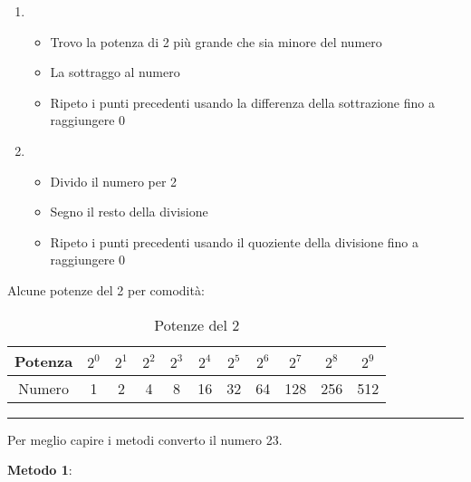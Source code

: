\documentclass{article}
\begin{document}
    \begin{enumerate}
        \item \begin{itemize}
            \item Trovo la potenza di 2 più grande che sia minore del numero
            \item La sottraggo al numero
            \item Ripeto i punti precedenti usando la differenza della sottrazione fino a raggiungere 0
        \end{itemize}

        \vspace{5pt}
        
        \item \begin{itemize}
            \item Divido il numero per 2
            \item Segno il resto della divisione
            \item Ripeto i punti precedenti usando il quoziente della divisione fino a raggiungere 0
        \end{itemize}
    \end{enumerate}

    \vspace{6pt}
    
    \noindent Alcune potenze del 2 per comodità:
    
    \begin{table}[ht]
        \centering
        \begin{tabular}{c|c|c|c|c|c|c|c|c|c|c}
          Potenza & $2^0$ & $2^1$ & $2^2$ & $2^3$ & $2^4$ & $2^5$ & $2^6$ & $2^7$ & $2^8$ & $2^9$\\
             \hline
          \rule{0pt}{3ex}Numero & 1 & 2 & 4 & 8 & 16 & 32 & 64 & 128 & 256 & 512\\
        \end{tabular}
        \caption{Potenze del 2}
        \label{tab:power}
    \end{table}

    \vspace{3pt}

\noindent\rule{\textwidth}{0.5pt}

    \noindent Per meglio capire i metodi converto il numero 23.

    \vspace{5pt}

    \textbf{Metodo 1}:
\end{document}
